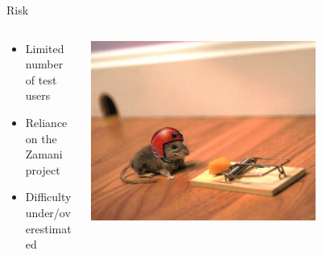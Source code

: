 \documentclass[compress]{beamer}
\begin{document}
\begin{frame}{Risk}
\begin{columns}[T]
\begin{column}{0.5\textwidth}
	\begin{itemize}
	    \item Limited number of test users
		\item Reliance on the Zamani project
		\item Difficulty under/overestimated
	\end{itemize}
\end{column}
\begin{column}{0.5\textwidth}
\includegraphics[width=0.7\textwidth]{pics/risk2}
\end{column}
\end{columns}
\end{frame}


%    
%    
%
% 
%    
%
\end{document}
